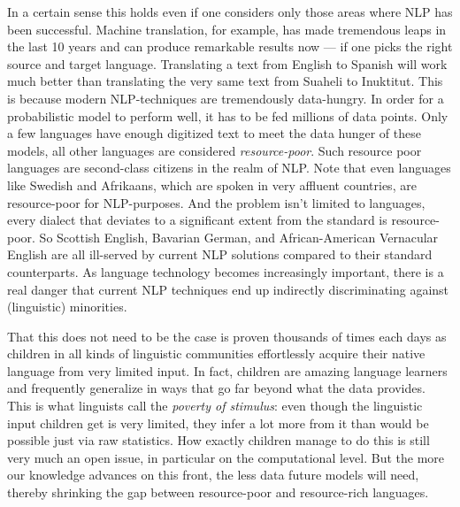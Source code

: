 In a certain sense this holds even if one considers only those areas where NLP has been successful.
Machine translation, for example, has made tremendous leaps in the last 10 years and can produce remarkable results now --- if one picks the right source and target language.
Translating a text from English to Spanish will work much better than translating the very same text from Suaheli to Inuktitut.
This is because modern NLP-techniques are tremendously data-hungry.
In order for a probabilistic model to perform well, it has to be fed millions of data points.
Only a few languages have enough digitized text to meet the data hunger of these models, all other languages are considered \emph{resource-poor}.
Such resource poor languages are second-class citizens in the realm of NLP\@.
Note that even languages like Swedish and Afrikaans, which are spoken in very affluent countries, are resource-poor for NLP-purposes.
And the problem isn't limited to languages, every dialect that deviates to a significant extent from the standard is resource-poor.
So Scottish English, Bavarian German, and African-American Vernacular English are all ill-served by current NLP solutions compared to their standard counterparts.
As language technology becomes increasingly important, there is a real danger that current NLP techniques end up indirectly discriminating against (linguistic) minorities.

That this does not need to be the case is proven thousands of times each days as children in all kinds of linguistic communities effortlessly acquire their native language from very limited input.
In fact, children are amazing language learners and frequently generalize in ways that go far beyond what the data provides.
This is what linguists call the \emph{poverty of stimulus}: even though the linguistic input children get is very limited, they infer a lot more from it than would be possible just via raw statistics. 
How exactly children manage to do this is still very much an open issue, in particular on the computational level.
But the more our knowledge advances on this front, the less data future models will need, thereby shrinking the gap between resource-poor and resource-rich languages.


